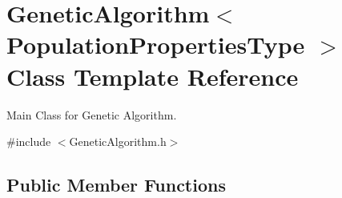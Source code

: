 \hypertarget{class_genetic_algorithm}{}\section{Genetic\+Algorithm$<$ Population\+Properties\+Type $>$ Class Template Reference}
\label{class_genetic_algorithm}


Main Class for Genetic Algorithm.  




{\ttfamily \#include $<$Genetic\+Algorithm.\+h$>$}

\subsection*{Public Member Functions}
